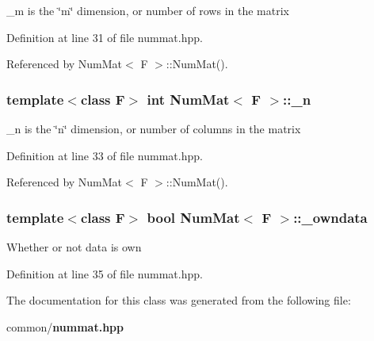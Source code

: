 \_\-m is the \char`\"{}m\char`\"{} dimension, or number of rows in the matrix 

Definition at line 31 of file nummat.hpp.

Referenced by Num\-Mat$<$ F $>$::Num\-Mat().
\subsubsection{\setlength{\rightskip}{0pt plus 5cm}template$<$class F$>$ int {\bf Num\-Mat}$<$ F $>$::{\bf \_\-n}}\label{classNumMat_b628b96b5cc160f67acf6b4673cdd8bb_b628b96b5cc160f67acf6b4673cdd8bb}


\_\-n is the \char`\"{}n\char`\"{} dimension, or number of columns in the matrix 

Definition at line 33 of file nummat.hpp.

Referenced by Num\-Mat$<$ F $>$::Num\-Mat().
\subsubsection{\setlength{\rightskip}{0pt plus 5cm}template$<$class F$>$ bool {\bf Num\-Mat}$<$ F $>$::{\bf \_\-owndata}}\label{classNumMat_4a613b2956a4a0ffff962e497a5d56e0_4a613b2956a4a0ffff962e497a5d56e0}


Whether or not data is own 

Definition at line 35 of file nummat.hpp.

The documentation for this class was generated from the following file:\begin{CompactItemize}
\item 
common/{\bf nummat.hpp}\end{CompactItemize}

